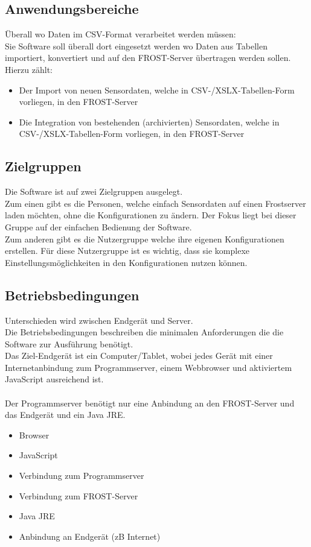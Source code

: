 \documentclass[12 pt]{article}
\begin{document}
\subsection{Anwendungsbereiche}
Überall wo Daten im CSV-Format verarbeitet werden müssen: \\
Sie Software soll überall dort eingesetzt werden wo Daten aus Tabellen importiert, konvertiert und auf den FROST-Server übertragen werden sollen. \\
Hierzu zählt:
\begin{itemize}
\item Der Import von neuen Sensordaten, welche in CSV-/XSLX-Tabellen-Form vorliegen, in den FROST-Server
\item Die Integration von bestehenden (archivierten) Sensordaten, welche in CSV-/XSLX-Tabellen-Form vorliegen, in den FROST-Server
\end{itemize}

\subsection{Zielgruppen}
Die Software ist auf zwei Zielgruppen ausgelegt.\\
Zum einen gibt es die Personen, welche einfach Sensordaten auf einen Frostserver laden möchten,  ohne die Konfigurationen zu ändern. Der Fokus liegt bei dieser Gruppe auf der einfachen Bedienung der Software.\\
Zum anderen gibt es die Nutzergruppe welche ihre eigenen Konfigurationen erstellen. Für diese Nutzergruppe ist es wichtig, dass sie komplexe Einstellungsmöglichkeiten in den Konfigurationen nutzen können.

\subsection{Betriebsbedingungen}
Unterschieden wird zwischen Endgerät und Server. \\
Die Betriebsbedingungen beschreiben die minimalen Anforderungen die die Software zur Ausführung benötigt. \\
Das Ziel-Endgerät ist ein Computer/Tablet, wobei jedes Gerät mit einer Internetanbindung zum Programmserver, einem Webbrowser und aktiviertem JavaScript ausreichend ist.\\
\ \\
Der Programmserver benötigt nur eine Anbindung an den FROST-Server und das Endgerät und ein Java JRE.
\begin{itemize}
	\item Browser
	\item JavaScript
	\item Verbindung zum Programmserver
\end{itemize}
\begin{itemize}
	\item Verbindung zum FROST-Server
	\item Java JRE
	\item Anbindung an Endgerät (zB Internet)
\end{itemize}
\end{document}
